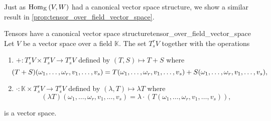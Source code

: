 Just as \(\Hom[\mathbb{K}]{V,W}\) had a canonical vector space structure, we show a similar result in \cref{prop:tensor_over_field_vector_space}.
\begin{proposition}{Tensors have a canonical vector space structure}{tensor_over_field_vector_space}
    Let \(V\) be a vector space over a field \(\mathbb{K}\). The set \(T_s^rV\) together with the operations
    \begin{enumerate}[label=(\alph*)]
        \item \(+: T_s^rV \times T_s^rV \to T_s^rV\) defined by \((T,S) \mapsto T+S\) where
            \begin{equation*}
                \hspace{-7pt}%
                (T+S)(\omega_1, \dots, \omega_r, v_1, \dots, v_s) = T(\omega_1, \dots, \omega_r, v_1, \dots, v_s) + S(\omega_1, \dots, \omega_r, v_1, \dots, v_s),
            \end{equation*}
        \item \(\cdot: \mathbb{K} \times T_s^rV \to T_s^rV\) defined by \((\lambda,T) \mapsto \lambda T\) where
            \begin{equation*}
                (\lambda T)(\omega_1, \dots, \omega_r, v_1, \dots, v_s) = \lambda \cdot \left(T(\omega_1, \dots, \omega_r, v_1, \dots, v_s)\right),
            \end{equation*}
    \end{enumerate}
    is a vector space.
\end{proposition}
